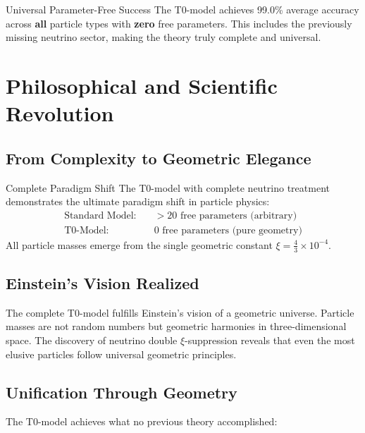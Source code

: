 \documentclass[12pt,a4paper]{article}
\begin{document}
	\begin{keyresult}{Universal Parameter-Free Success}{}
		The T0-model achieves 99.0\% average accuracy across \textbf{all} particle types with \textbf{zero} free parameters. This includes the previously missing neutrino sector, making the theory truly complete and universal.
	\end{keyresult}
	

	\section{Philosophical and Scientific Revolution}
	\label{sec:philosophical_revolution}
	
	\subsection{From Complexity to Geometric Elegance}
	\label{subsec:geometric_elegance}
	
	\begin{important}{Complete Paradigm Shift}{}
		The T0-model with complete neutrino treatment demonstrates the ultimate paradigm shift in particle physics:
		\begin{align}
			\text{Standard Model:} \quad &> 20 \text{ free parameters (arbitrary)} \\
			\text{T0-Model:} \quad &0 \text{ free parameters (pure geometry)}
		\end{align}
		All particle masses emerge from the single geometric constant $\xi = \frac{4}{3} \times 10^{-4}$.
	\end{important}
	
	\subsection{Einstein's Vision Realized}
	\label{subsec:einstein_vision}
	
	The complete T0-model fulfills Einstein's vision of a geometric universe. Particle masses are not random numbers but geometric harmonies in three-dimensional space. The discovery of neutrino double $\xi$-suppression reveals that even the most elusive particles follow universal geometric principles.
	
	\subsection{Unification Through Geometry}
	\label{subsec:unification}
	
	The T0-model achieves what no previous theory accomplished:
	
\end{document}

